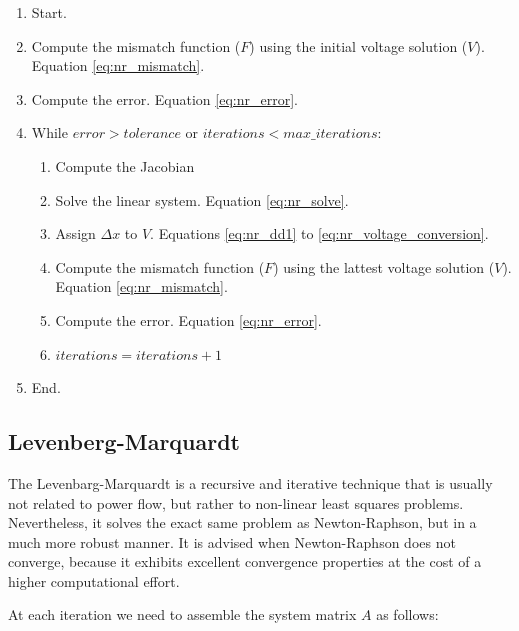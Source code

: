 \documentclass{tufte-book}
\begin{document}
\begin{enumerate}

\item Start.

\item Compute the mismatch function ($F$) using the initial voltage solution ($V$). Equation \ref{eq:nr_mismatch}.

\item Compute the error. Equation \ref{eq:nr_error}.

\item While $error > tolerance$ or $iterations < max\_iterations$:

	\begin{enumerate}
	\item Compute the Jacobian
	
	\item Solve the linear system. Equation \ref{eq:nr_solve}.
	
	\item Assign $\Delta x$ to $V$. Equations \ref{eq:nr_dd1} to \ref{eq:nr_voltage_conversion}.
	
	\item Compute the mismatch function ($F$) using the lattest voltage solution ($V$). Equation \ref{eq:nr_mismatch}.
	
	\item Compute the error. Equation \ref{eq:nr_error}.
	
	\item $iterations = iterations + 1$
	\end{enumerate}

\item End.
\end{enumerate}



\newpage
\subsection{Levenberg-Marquardt}

The Levenbarg-Marquardt is a recursive and iterative technique that is usually not related to power flow, but rather to non-linear least squares problems. Nevertheless, it solves the exact same problem as Newton-Raphson, but in a much more robust manner. It is advised when Newton-Raphson does not converge, because it exhibits excellent convergence properties at the cost of a higher computational effort.


At each iteration we need to assemble the system matrix $A$ as follows:
%
%
%
\end{document}
